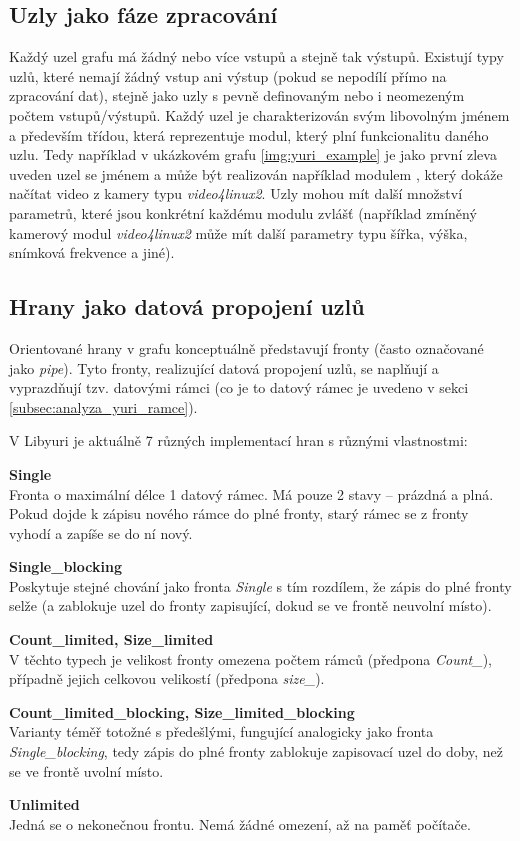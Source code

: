 \documentclass[thesis=M,czech]{FITthesis}[2012/06/26]
\begin{document}
\subsection{Uzly jako fáze zpracování} \label{subsec:analyza_yuri_uzly}
Každý uzel grafu má žádný nebo více vstupů a stejně tak výstupů. Existují typy uzlů, které nemají žádný vstup ani výstup (pokud se nepodílí přímo na zpracování dat), stejně jako uzly s pevně definovaným nebo i neomezeným počtem vstupů/výstupů. Každý uzel je charakterizován svým libovolným jménem a především třídou, která reprezentuje modul, který plní funkcionalitu daného uzlu. Tedy například v ukázkovém grafu \ref{img:yuri_example} je jako první zleva uveden uzel se jménem  a může být realizován například modulem , který dokáže načítat video z kamery typu \textit{video4linux2}. Uzly mohou mít další množství parametrů, které jsou konkrétní každému modulu zvlášť (například zmíněný kamerový modul \textit{video4linux2} může mít další parametry typu šířka, výška, snímková frekvence a jiné).

\subsection{Hrany jako datová propojení uzlů} \label{subsec:analyza_yuri_hrany}
Orientované hrany v grafu konceptuálně představují fronty (často označované jako \textit{pipe}). Tyto fronty, realizující datová propojení uzlů, se naplňují a vyprazdňují tzv. datovými rámci (co je to datový rámec je uvedeno v sekci \ref{subsec:analyza_yuri_ramce}).

V Libyuri je aktuálně 7 různých implementací hran s různými vlastnostmi:
\begin{description}
  \item \textbf{Single\\}
Fronta o maximální délce 1 datový rámec. Má pouze 2 stavy -- prázdná a plná. Pokud dojde k zápisu nového rámce do plné fronty, starý rámec se z fronty vyhodí a zapíše se do ní nový.
  \item \textbf{Single\_blocking\\}
 Poskytuje stejné chování jako fronta \textit{Single} s tím rozdílem, že zápis do plné fronty selže (a zablokuje uzel do fronty zapisující, dokud se ve frontě neuvolní místo).
  \item \textbf{Count\_limited, Size\_limited\\}
 V těchto typech je velikost fronty omezena počtem rámců (předpona \textit{Count\_}), případně jejich celkovou velikostí (předpona \textit{size\_}).
  \item \textbf{Count\_limited\_blocking, Size\_limited\_blocking\\}
  Varianty téměř totožné s předešlými, fungující analogicky jako fronta \textit{Single\_blocking}, tedy zápis do plné fronty zablokuje zapisovací uzel do doby, než se ve frontě uvolní místo.
  \item \textbf{Unlimited\\}
Jedná se o nekonečnou frontu. Nemá žádné omezení, až na paměť počítače.
\end{description}
\end{document}
